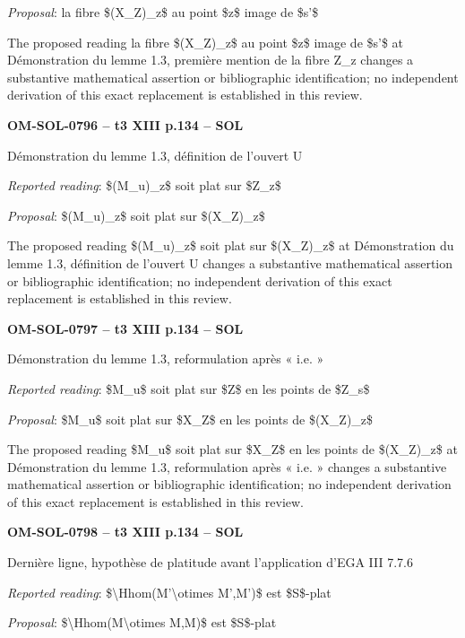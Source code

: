 \emph{Proposal}: la fibre \$(X\_Z)\_z\$ au point \$z\$ image de \$s'\$\par
The proposed reading la fibre \$(X\_Z)\_z\$ au point \$z\$ image de \$s'\$ at Démonstration du lemme 1.3, première mention de la fibre Z\_z changes a substantive mathematical assertion or bibliographic identification; no independent derivation of this exact replacement is established in this review.\par
\par\noindent\textbf{OM-SOL-0796 -- t3 XIII p.134 -- SOL}\par
Démonstration du lemme 1.3, définition de l'ouvert U\par
\emph{Reported reading}: \$(M\_u)\_z\$ soit plat sur \$Z\_z\$\par
\emph{Proposal}: \$(M\_u)\_z\$ soit plat sur \$(X\_Z)\_z\$\par
The proposed reading \$(M\_u)\_z\$ soit plat sur \$(X\_Z)\_z\$ at Démonstration du lemme 1.3, définition de l'ouvert U changes a substantive mathematical assertion or bibliographic identification; no independent derivation of this exact replacement is established in this review.\par
\par\noindent\textbf{OM-SOL-0797 -- t3 XIII p.134 -- SOL}\par
Démonstration du lemme 1.3, reformulation après « i.e. »\par
\emph{Reported reading}: \$M\_u\$ soit plat sur \$Z\$ en les points de \$Z\_s\$\par
\emph{Proposal}: \$M\_u\$ soit plat sur \$X\_Z\$ en les points de \$(X\_Z)\_z\$\par
The proposed reading \$M\_u\$ soit plat sur \$X\_Z\$ en les points de \$(X\_Z)\_z\$ at Démonstration du lemme 1.3, reformulation après « i.e. » changes a substantive mathematical assertion or bibliographic identification; no independent derivation of this exact replacement is established in this review.\par
\par\noindent\textbf{OM-SOL-0798 -- t3 XIII p.134 -- SOL}\par
Dernière ligne, hypothèse de platitude avant l'application d'EGA III 7.7.6\par
\emph{Reported reading}: \$\textbackslash{}Hhom(M'\textbackslash{}otimes M',M')\$ est \$S\$-plat\par
\emph{Proposal}: \$\textbackslash{}Hhom(M\textbackslash{}otimes M,M)\$ est \$S\$-plat\par
